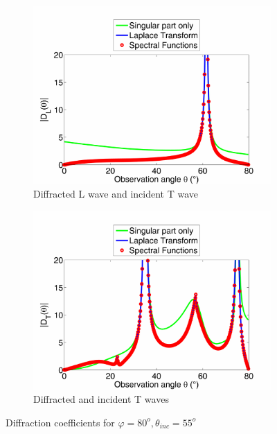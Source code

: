 \begin{figure}
\begin{subfigure}[b]{0.44\textwidth}
        \includegraphics[width=\textwidth]{images/chapter3/Figure8c.pdf}
        \caption{Diffracted L wave and incident T wave}
    \end{subfigure}
    \begin{subfigure}[b]{0.44\textwidth}
        \includegraphics[width=\textwidth]{images/chapter3/Figure8d.pdf}
        \caption{Diffracted and incident T waves}
     \end{subfigure}
     \caption{Diffraction coefficients for $\varphi=80^o, \theta_{inc}=55^o$}
     \label{8055}
\end{figure}

